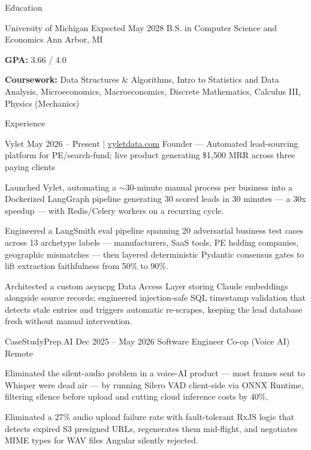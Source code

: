 \documentclass[
	11pt
]{../../../template}
\begin{document}
	\begin{rSection}{E}{ducation}
		\begin{rSectionEntry}
			{University of Michigan}
			{Expected May 2028}
			{B.S. in Computer Science and Economics}
			{}
			{Ann Arbor, MI}

			\item \textbf{GPA:} 3.66 / 4.0
			\item \textbf{Coursework:} Data Structures \& Algorithms, Intro to Statistics and Data Analysis, Microeconomics, Macroeconomics, Discrete Mathematics, Calculus III, Physics (Mechanics)
		\end{rSectionEntry}
	\end{rSection}

	\begin{rSection}{E}{xperience}
		\begin{rSectionEntry}
			{Vylet}
			{May 2026 -- Present $\vert$ \href{https://vyletdata.com}{vyletdata.com}}
			{Founder --- Automated lead-sourcing platform for PE/search-fund; live product generating \$1,500 MRR across three paying clients}
			{}
			{}

			\item Launched Vylet, automating a $\sim$30-minute manual process per business into a Dockerized LangGraph pipeline generating 30 scored leads in 30 minutes --- a 30x speedup --- with Redis/Celery workers on a recurring cycle.
			\item Engineered a LangSmith eval pipeline spanning 20 adversarial business test cases across 13 archetype labels --- manufacturers, SaaS tools, PE holding companies, geographic mismatches --- then layered deterministic Pydantic consensus gates to lift extraction faithfulness from 50\% to 90\%.
			\item Architected a custom asyncpg Data Access Layer storing Claude embeddings alongside source records; engineered injection-safe SQL timestamp validation that detects stale entries and triggers automatic re-scrapes, keeping the lead database fresh without manual intervention.
		\end{rSectionEntry}

		\begin{rSectionEntry}
			{CaseStudyPrep.AI}
			{Dec 2025 -- May 2026}
			{Software Engineer Co-op (Voice AI)}
			{}
			{Remote}

			\item Eliminated the silent-audio problem in a voice-AI product --- most frames sent to Whisper were dead air --- by running Silero VAD client-side via ONNX Runtime, filtering silence before upload and cutting cloud inference costs by 40\%.
			\item Eliminated a 27\% audio upload failure rate with fault-tolerant RxJS logic that detects expired S3 presigned URLs, regenerates them mid-flight, and negotiates MIME types for WAV files Angular silently rejected.
		\end{rSectionEntry}
	\end{rSection}
\end{document}
